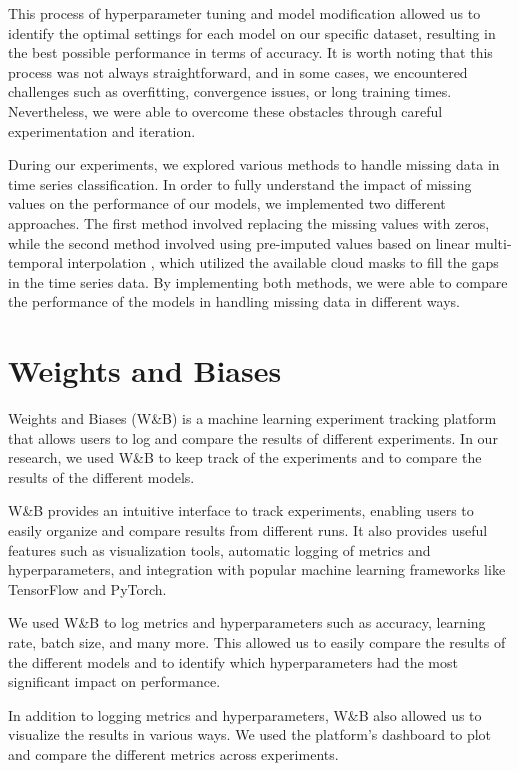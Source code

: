 This process of hyperparameter tuning and model modification allowed us to identify the optimal settings for each model on our specific dataset, resulting in the best possible performance in terms of accuracy.
It is worth noting that this process was not always straightforward, and in some cases, we encountered challenges such as overfitting, convergence issues, or long training times.
Nevertheless, we were able to overcome these obstacles through careful experimentation and iteration.

During our experiments, we explored various methods to handle missing data in time series classification. 
In order to fully understand the impact of missing values on the performance of our models, we implemented two different approaches.
The first method involved replacing the missing values with zeros, while the second method involved using pre-imputed values based on linear multi-temporal interpolation \cite{IENCO201911}, which utilized the available cloud masks to fill the gaps in the time series data. 
By implementing both methods, we were able to compare the performance of the models in handling missing data in different ways.


\section{Weights and Biases}

Weights and Biases (W\&B) \cite{wandb} is a machine learning experiment tracking platform that allows users to log and compare the results of different experiments. 
In our research, we used W\&B to keep track of the experiments and to compare the results of the different models.

W\&B provides an intuitive interface to track experiments, enabling users to easily organize and compare results from different runs.
It also provides useful features such as visualization tools, automatic logging of metrics and hyperparameters, and integration with popular machine learning frameworks like TensorFlow and PyTorch.

We used W\&B to log metrics and hyperparameters such as accuracy, learning rate, batch size, and many more. 
This allowed us to easily compare the results of the different models and to identify which hyperparameters had the most significant impact on performance.

In addition to logging metrics and hyperparameters, W\&B also allowed us to visualize the results in various ways. 
We used the platform's dashboard to plot and compare the different metrics across experiments.

